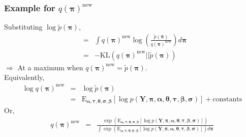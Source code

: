 \documentclass{beamer}
\numberwithin{equation}{section}
\begin{document}
\begin{frame}
\frametitle{Example for $q(\boldsymbol{\pi})^{\text{new}}$}
Substituting $\log \tilde{p}(\boldsymbol{\pi})$,
\begin{eqnarray}
& = & \int q(\boldsymbol{\pi})^{\text{new}} \log
\left(\frac{\tilde{p}(\boldsymbol{\pi})}{q(\boldsymbol{\pi})^{\text{new}}}
\right)d\boldsymbol{\pi} \nonumber \\
& = & -
\text{KL}(q(\boldsymbol{\pi})^{\text{new}}||\tilde{p}(\boldsymbol{\pi})
) \nonumber
\end{eqnarray}
$\Rightarrow$ At a maximum when $q(\boldsymbol{\pi})^{\text{new}}
=\tilde{p}(\boldsymbol{\pi}) $.  \\
Equivalently,
\begin{eqnarray}
\log q(\boldsymbol{\pi})^{\text{new}} & = & \log
\tilde{p}(\boldsymbol{\pi}) \nonumber \\
& = & \text{E}_{\boldsymbol{\alpha}, \boldsymbol{\tau},
\boldsymbol{\theta}, \boldsymbol{\sigma}, \boldsymbol{\beta} }[\log
p(\boldsymbol{Y}, \boldsymbol{\pi}, \boldsymbol{\alpha},
\boldsymbol{\theta}, \boldsymbol{\tau}, \boldsymbol{\beta},
\boldsymbol{\sigma})] + \text{constants}\nonumber
\end{eqnarray}
Or,
\begin{eqnarray}
q(\boldsymbol{\pi})^{\text{new}} & = &
\frac{\exp(\text{E}_{\boldsymbol{\alpha}, \boldsymbol{\tau},
\boldsymbol{\theta}, \boldsymbol{\sigma}, \boldsymbol{\beta} }[\log
p(\boldsymbol{Y}, \boldsymbol{\pi}, \boldsymbol{\alpha},
\boldsymbol{\theta}, \boldsymbol{\tau}, \boldsymbol{\beta},
\boldsymbol{\sigma})])}{\int \exp(\text{E}_{\boldsymbol{\alpha},
\boldsymbol{\tau}, \boldsymbol{\theta}, \boldsymbol{\sigma},
\boldsymbol{\beta} }[\log p(\boldsymbol{Y}, \boldsymbol{\pi},
\boldsymbol{\alpha}, \boldsymbol{\theta}, \boldsymbol{\tau},
\boldsymbol{\beta}, \boldsymbol{\sigma})])d\boldsymbol{\pi}}
\nonumber
\end{eqnarray}

\end{frame}
\end{document}
